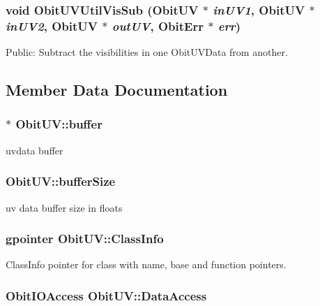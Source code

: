 \subsubsection{\setlength{\rightskip}{0pt plus 5cm}void Obit\-UVUtil\-Vis\-Sub ({\bf Obit\-UV} $\ast$ {\em in\-UV1}, {\bf Obit\-UV} $\ast$ {\em in\-UV2}, {\bf Obit\-UV} $\ast$ {\em out\-UV}, {\bf Obit\-Err} $\ast$ {\em err})\hspace{0.3cm}{\tt  [related]}}\label{structObitUV_m0}


Public: Subtract the visibilities in one Obit\-UVData from another. 



\subsection{Member Data Documentation}
\subsubsection{$\ast$ {\bf Obit\-UV::buffer}}\label{structObitUV_o13}


uvdata buffer 

\subsubsection{ {\bf Obit\-UV::buffer\-Size}}\label{structObitUV_o14}


uv data buffer size in floats 

\subsubsection{\setlength{\rightskip}{0pt plus 5cm}gpointer {\bf Obit\-UV::Class\-Info}}\label{structObitUV_o1}


Class\-Info pointer for class with name, base and function pointers. 

\subsubsection{\setlength{\rightskip}{0pt plus 5cm}Obit\-IOAccess {\bf Obit\-UV::Data\-Access}}\label{structObitUV_o7}


